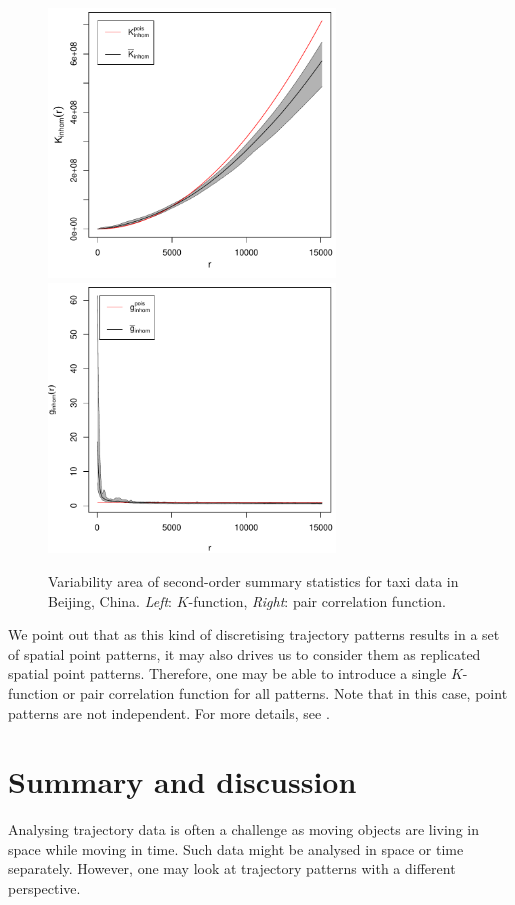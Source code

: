 \documentclass[article]{jss}
\begin{document}
  \begin{figure}[!h]
  \centering
  \includegraphics[width = 3in]{Kfun}
  \includegraphics[width = 3in]{gfun}
  \caption{Variability area of second-order summary statistics for taxi data in Beijing, China. \emph{Left}: $K$-function, \emph{Right}: pair correlation function.}
  \label{Kgvariation}
  \end{figure}

  We point out that as this kind of discretising trajectory patterns results in a set of spatial point patterns, it may also drives us to consider them as replicated spatial point patterns. Therefore, one may be able to introduce a single $K$-function or pair correlation function for all patterns. Note that in this case, point patterns are not independent. For more details, see \cite[Section 5.4]{D13}.
  
 \section{Summary and discussion} \label{sec:summary}
  Analysing trajectory data is often a challenge as moving objects are living in space while moving in time. Such data might be analysed in space or time separately. However, one may look at trajectory patterns with a different perspective. 
  
\end{document}

